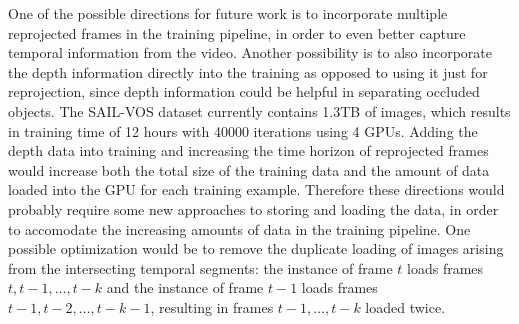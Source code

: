 One of the possible directions for future work is to incorporate multiple reprojected frames in the training pipeline, 
in order to even better capture temporal information from the video. 
Another possibility is to also incorporate the depth information directly into the training as opposed to using it just for reprojection, 
since depth information could be helpful in separating occluded objects.
The SAIL-VOS dataset currently contains 1.3TB of images, which results in training time of 12 hours with 40000 iterations using 4 GPUs.
Adding the depth data into training and increasing the time horizon of reprojected frames would increase both the total size
of the training data and the amount of data loaded into the GPU for each training example.
Therefore these directions would probably require some new approaches to storing and loading the data, 
in order to accomodate the increasing amounts of data in the training pipeline. One possible optimization would be to 
remove the duplicate loading of images arising from the intersecting temporal segments: the instance of frame 
$t$ loads frames $t, t-1, \ldots, t-k$ and the instance of frame $t-1$ loads frames $t-1, t-2, \ldots, t-k-1$, resulting in frames
$t-1, \ldots, t-k$ loaded twice.

